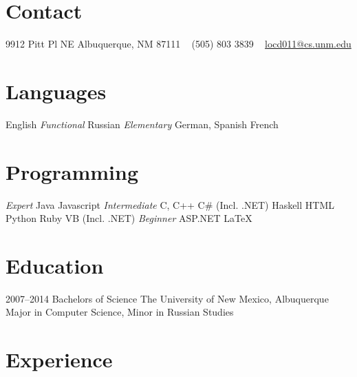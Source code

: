 \documentclass[]{friggeri-cv} %
\begin{document}


\begin{aside} %
\section{Contact}
9912 Pitt Pl NE
Albuquerque, NM 87111
~
(505) 803 3839
~
\href{mailto:locd011@gmail.com}{locd011@cs.unm.edu}
\section{Languages}
English
{\emph{Functional}}
Russian
{\emph{Elementary}}
German, Spanish
French
\section{Programming}
{\emph{Expert}}
Java
Javascript
{\emph{Intermediate}}
C, C++
C\# (Incl. .NET)
Haskell
HTML
Python
Ruby
VB (Incl. .NET)
{\emph{Beginner}}
ASP.NET
LaTeX
\end{aside}


\section{Education}

\begin{entrylist}
\entry
{2007--2014}
{Bachelors {\normalfont of Science}}
{The University of New Mexico, Albuquerque}
{Major in Computer Science, Minor in Russian Studies}
\end{entrylist}


\section{Experience}
\end{document}

